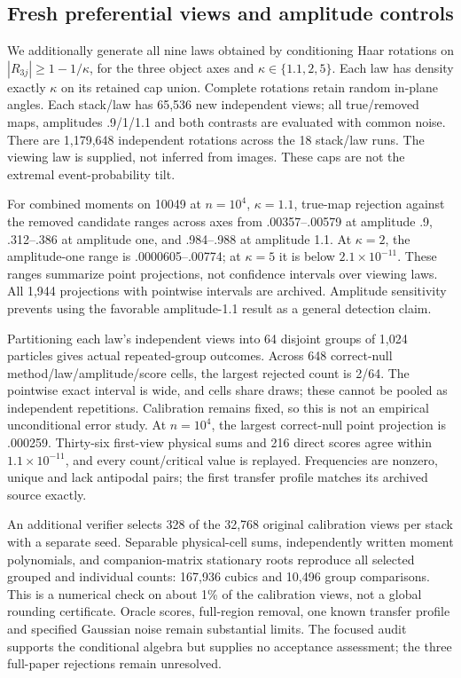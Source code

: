 \subsection{Fresh preferential views and amplitude controls}
We additionally generate all nine laws obtained by conditioning Haar rotations
on $|R_{3j}|\ge1-1/\kappa$, for the three object axes and
$\kappa\in\{1.1,2,5\}$. Each law has density exactly $\kappa$ on its
retained cap union. Complete rotations retain random in-plane angles.
Each stack/law has 65,536 new independent views; all true/removed maps,
amplitudes .9/1/1.1 and both contrasts are evaluated with common noise.
There are 1,179,648 independent rotations across the 18 stack/law runs.
The viewing law is supplied, not inferred from images. These caps are not the
extremal event-probability tilt.

For combined moments on 10049 at $n=10^4$, $\kappa=1.1$, true-map rejection
against the removed candidate ranges across axes from .00357--.00579 at
amplitude .9, .312--.386 at amplitude one, and .984--.988 at amplitude 1.1.
At $\kappa=2$, the amplitude-one range is .0000605--.00774; at $\kappa=5$
it is below $2.1\times10^{-11}$. These ranges summarize point projections,
not confidence intervals over viewing laws. All 1,944 projections with
pointwise intervals are archived. Amplitude sensitivity prevents using the
favorable amplitude-1.1 result as a general detection claim.

Partitioning each law's independent views into 64 disjoint groups of 1,024
particles gives actual repeated-group outcomes. Across 648 correct-null
method/law/amplitude/score cells, the largest rejected count is 2/64. The
pointwise exact interval is wide, and cells share draws; these cannot be pooled
as independent repetitions. Calibration remains fixed, so this is not an
empirical unconditional error study. At $n=10^4$, the largest correct-null
point projection is .000259. Thirty-six first-view physical sums and 216
direct scores agree within $1.1\times10^{-11}$, and every count/critical value
is replayed. Frequencies are nonzero, unique and lack antipodal pairs; the
first transfer profile matches its archived source exactly.

An additional verifier selects 328 of the 32,768 original calibration views
per stack with a separate seed. Separable physical-cell sums, independently
written moment polynomials, and companion-matrix stationary roots reproduce
all selected grouped and individual counts: 167,936 cubics and 10,496 group
comparisons. This is a numerical check on about 1\% of the calibration views,
not a global rounding certificate. Oracle scores, full-region removal, one
known transfer profile and specified Gaussian noise remain substantial limits.
The focused audit supports the conditional algebra but supplies no acceptance
assessment; the three full-paper rejections remain unresolved.


